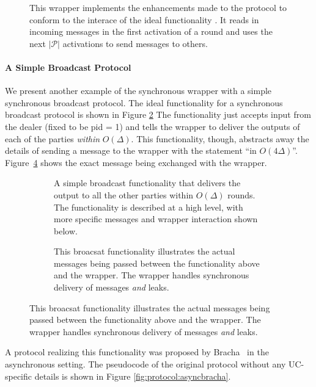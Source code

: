 \begin{figure}
	
	\caption{This wrapper implements the enhancements made to the protocol to conform to the interace of the ideal functionality \Fbc. It reads in incoming messages in the first activation of a round and uses the next $|\mathcal{P}|$ activations to send messages to others.}
	\label{fig:wrapper:synchronous}
\end{figure}

\paragraph{A Simple Broadcast Protocol}
We present another example of the synchronous wrapper with a simple synchronous broadcast protocol.
The ideal functionality for a synchronous broadcast protocol is shown in Figure \ref{fig:functionality:broadcast_import}
The functionality just accepts input from the dealer (fixed to be pid = 1) and tells the wrapper to deliver the outputs of each of the parties \emph{within} $O(\Delta)$.
This functionality, though, abstracts away the details of sending a message to the wrapper with the statement ``in $O(4\Delta)$''.
Figure~\ref{fig:functionality:broadcast_import_real} shows the exact message being exchanged with the wrapper.

\begin{figure}
\begin{subfigure}{\textwidth}
	
	\caption{A simple broadcast functionality that delivers the output to all the other parties within $O(\Delta)$ rounds. The functionality is described at a high level, with more specific messages and wrapper interaction shown below.}
	\label{fig:functionality:broadcast_import}
\end{subfigure}
\newline
\begin{subfigure}{\textwidth}
	
	\caption{This broacsat functionality illustrates the actual messages being passed between the functionality above and the wrapper. The wrapper handles synchronous delivery of messages {\em and} leaks.}
	\label{fig:functionality:broadcast_import_real}
\end{subfigure}
\end{figure}


A protocol realizing this functionality was proposed by Bracha~\cite{bracha} in the asynchronous setting.
The pseudocode of the original protocol without any UC-specific details is shown in Figure \ref{fig:protocol:asyncbracha}.

